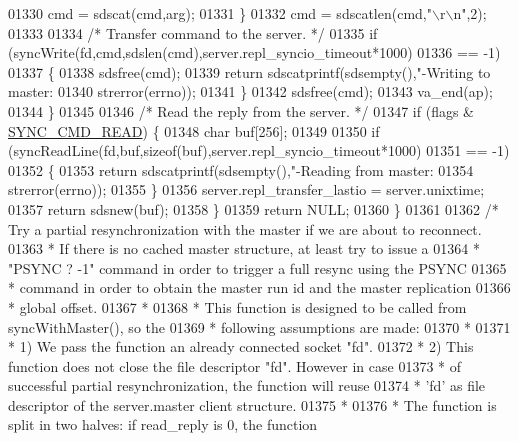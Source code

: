 \begin{DoxyCode}
{{{{{{{{{{{{{{{{{{{{{{{{{{{{{{{{{{{{{{{{{{{{{{{{01330             cmd = sdscat(cmd,arg);
01331         \}
01332         cmd = sdscatlen(cmd,\textcolor{stringliteral}{"\(\backslash\)r\(\backslash\)n"},2);
01333 
01334         \textcolor{comment}{/* Transfer command to the server. */}
01335         \textcolor{keywordflow}{if} (syncWrite(fd,cmd,sdslen(cmd),server.repl\_syncio\_timeout*1000)
01336             == -1)
01337         \{
01338             sdsfree(cmd);
01339             \textcolor{keywordflow}{return} sdscatprintf(sdsempty(),\textcolor{stringliteral}{"-Writing to master: %
01340                     strerror(errno));
01341         \}
01342         sdsfree(cmd);
01343         va\_end(ap);
01344     \}
01345 
01346     \textcolor{comment}{/* Read the reply from the server. */}
01347     \textcolor{keywordflow}{if} (flags & \hyperlink{replication_8c_a5dde0948d622fc1b0327b0d49cb3cef5}{SYNC\_CMD\_READ}) \{
01348         \textcolor{keywordtype}{char} buf[256];
01349 
01350         \textcolor{keywordflow}{if} (syncReadLine(fd,buf,\textcolor{keyword}{sizeof}(buf),server.repl\_syncio\_timeout*1000)
01351             == -1)
01352         \{
01353             \textcolor{keywordflow}{return} sdscatprintf(sdsempty(),\textcolor{stringliteral}{"-Reading from master: %
01354                     strerror(errno));
01355         \}
01356         server.repl\_transfer\_lastio = server.unixtime;
01357         \textcolor{keywordflow}{return} sdsnew(buf);
01358     \}
01359     \textcolor{keywordflow}{return} NULL;
01360 \}
01361 
01362 \textcolor{comment}{/* Try a partial resynchronization with the master if we are about to reconnect.}
01363 \textcolor{comment}{ * If there is no cached master structure, at least try to issue a}
01364 \textcolor{comment}{ * "PSYNC ? -1" command in order to trigger a full resync using the PSYNC}
01365 \textcolor{comment}{ * command in order to obtain the master run id and the master replication}
01366 \textcolor{comment}{ * global offset.}
01367 \textcolor{comment}{ *}
01368 \textcolor{comment}{ * This function is designed to be called from syncWithMaster(), so the}
01369 \textcolor{comment}{ * following assumptions are made:}
01370 \textcolor{comment}{ *}
01371 \textcolor{comment}{ * 1) We pass the function an already connected socket "fd".}
01372 \textcolor{comment}{ * 2) This function does not close the file descriptor "fd". However in case}
01373 \textcolor{comment}{ *    of successful partial resynchronization, the function will reuse}
01374 \textcolor{comment}{ *    'fd' as file descriptor of the server.master client structure.}
01375 \textcolor{comment}{ *}
01376 \textcolor{comment}{ * The function is split in two halves: if read\_reply is 0, the function}
}}}}}}}}}}}}}}}}}}}}}}}}}}}}}}}}}}}}}}}}}}}}}}}}}}
\end{DoxyCode}
